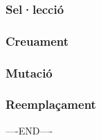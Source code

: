 \documentclass[titlepage,a4paper,12pt]{book}
\begin{document}
\subsubsection{Sel·lecció} %
\label{ssub:Seleccio}

\subsubsection{Creuament} %
\label{ssub:Creuament}

\subsubsection{Mutació} %
\label{ssub:Mutacio}

\subsubsection{Reemplaçament} %
\label{ssub:Reemplacament}










----END----


\end{document}
